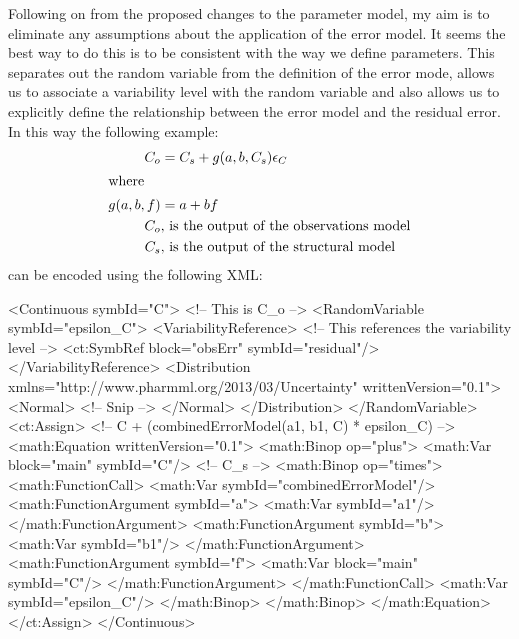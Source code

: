 \documentclass[a4paper,11pt]{article}
\begin{document}
Following on from the proposed changes to the parameter model, my aim
is to eliminate any assumptions about the application of the error
model. It seems the best way to do this is to be consistent with the
way we define parameters. This separates out the random variable from
the definition of the error mode, allows us to associate a variability
level with the random variable and also allows us to explicitly define
the relationship between the error model and the residual error. In
this way the following example:
%
\begin{align*}
C_{o} &= C_{s} + g(a, b, C_{s}) \epsilon_{C}\\
\intertext{where}
g(a,b,f) &= a + bf\\
C_{o} & \text{, is the output of the observations model}\nonumber\\
C_{s} & \text{, is the output of the structural model}\nonumber
\end{align*}
%
can be encoded using the following XML:
%
\begin{xmlcode}
<Continuous symbId="C"> <!-- This is C_{o} -->
    <RandomVariable symbId="epsilon_C">
        <VariabilityReference> <!-- This references the variability level -->
            <ct:SymbRef block="obsErr" symbId="residual"/>
        </VariabilityReference>
        <Distribution xmlns="http://www.pharmml.org/2013/03/Uncertainty"
            writtenVersion="0.1">
            <Normal>
              <!-- Snip -->
            </Normal>
        </Distribution>
    </RandomVariable>
    <ct:Assign>
        <!-- C + (combinedErrorModel(a1, b1, C) * epsilon_C) -->
        <math:Equation writtenVersion="0.1">
            <math:Binop op="plus">
                <math:Var block="main" symbId="C"/> <!-- C_{s} -->
                <math:Binop op="times">
                    <math:FunctionCall>
                        <math:Var symbId="combinedErrorModel"/>
                        <math:FunctionArgument symbId="a">
                            <math:Var symbId="a1"/>
                        </math:FunctionArgument>
                        <math:FunctionArgument symbId="b">
                            <math:Var symbId="b1"/>
                        </math:FunctionArgument>
                        <math:FunctionArgument symbId="f">
                            <math:Var block="main" symbId="C"/>
                        </math:FunctionArgument>
                    </math:FunctionCall>
                    <math:Var symbId="epsilon_C"/>
                </math:Binop>
            </math:Binop>
        </math:Equation>
    </ct:Assign>
</Continuous>
\end{xmlcode}
\end{document}
